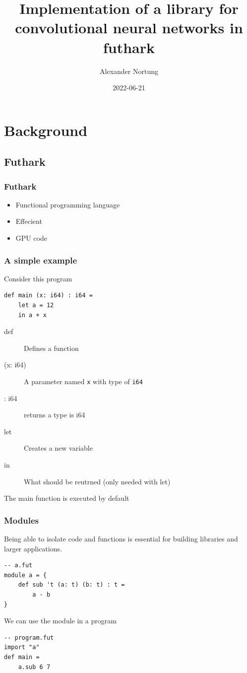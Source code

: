 \documentclass{beamer}
\title{Implementation of a library for convolutional neural networks in futhark}
\author{Alexander Nortung}
\institute{University of Copenhagen}
\date{2022-06-21}
\begin{document}
\begin{frame}
    \titlepage
\end{frame}


\section{Background}

\subsection{Futhark}

\begin{frame}
    \frametitle{Futhark}
    \begin{itemize}
        \item Functional programming language
        \item Effecient
        \item GPU code
    \end{itemize}
\end{frame}

\begin{frame}[fragile]
    \frametitle{A simple example}
    Consider this program
    \begin{lstlisting}
def main (x: i64) : i64 =
    let a = 12
    in a + x
    \end{lstlisting}
    \pause
    \begin{description}
        \item[def] Defines a function
        \item[(x: i64)] A parameter named \texttt{x} with type of \texttt{i64}
        \item[: i64] returns a type is i64
        \pause
        \item[let] Creates a new variable
        \item[in] What should be reutrned (only needed with let)
    \end{description}
    \pause
    The main function is executed by default
\end{frame}

\begin{frame}[fragile]
    \frametitle{Modules}
    Being able to isolate code and functions is essential for building libraries and larger applications.
    \begin{lstlisting}
-- a.fut
module a = {
    def sub 't (a: t) (b: t) : t =
        a - b
}
    \end{lstlisting}
    \pause
    We can use the module in a program
    \begin{lstlisting}
-- program.fut
import "a"
def main =
    a.sub 6 7
    \end{lstlisting}
\end{frame}
\end{document}
